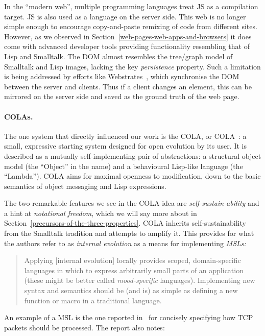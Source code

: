 \documentclass[ twoside,openright,titlepage,numbers=noenddot,headinclude,footinclude,cleardoublepage=empty,abstract=on,
                BCOR=5mm,paper=a4,fontsize=11pt
                ]{scrreprt}
\theoremstyle{definition}
\begin{document}
In the ``modern web'', multiple programming languages treat \ac{JS} as a
compilation target. \ac{JS} is also used as a language on the server
side. This web is no longer simple enough to encourage copy-and-paste
remixing of code from different sites. However, as we observed in
Section~\ref{web-pages-web-apps-and-browsers} it does come with advanced
developer tools providing functionality resembling that of Lisp and
Smalltalk. The \ac{DOM} almost resembles the tree/graph model of
Smalltalk and Lisp images, lacking the key \emph{persistence} property.
Such a limitation is being addressed by efforts like
Webstrates~\parencite{Webstrates}, which synchronise the \ac{DOM}
between the server and clients. Thus if a client changes an element,
this can be mirrored on the server side and saved as the ground truth of
the web page.

\paragraph{COLAs.}

The one system that directly influenced our work is the \Acl{COLA}, or
\ac{COLA}~\parencite{COLAs}: a small, expressive starting system
designed for open evolution by its user. It is described as a mutually
self-implementing pair of abstractions: a structural object model (the
``Object'' in the name) and a behavioural Lisp-like language (the
``Lambda''). \ac{COLA} aims for maximal openness to modification, down
to the basic semantics of object messaging and Lisp expressions.

The two remarkable features we see in the \ac{COLA} idea are
\emph{self-sustain-ability} and a hint at \emph{notational freedom},
which we will say more about in
Section~\ref{precursors-of-the-three-properties}. \ac{COLA} inherits
self-sustainability from the Smalltalk tradition and attempts to amplify
it. This provides for what the authors refer to as \emph{internal
evolution} as a means for implementing \emph{\acp{MSL}:}

\begin{quote}
Applying {[}internal evolution{]} locally provides scoped,
domain-specific languages in which to express arbitrarily small parts of
an application (these might be better called \emph{mood-specific}
languages). Implementing new syntax and semantics should be (and is) as
simple as defining a new function or macro in a traditional language.
\end{quote}

An example of a \ac{MSL} is the one reported
in~\parencite[p.\ 4]{Steps08} for concisely specifying how TCP packets
should be processed. The report also notes:
\end{document}
